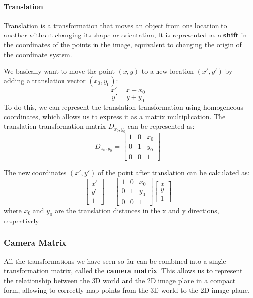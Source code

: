 \paragraph{Translation}
Translation is a transformation that moves an object from one location to another without changing its shape or orientation, 
It is represented as a \textbf{shift} in the coordinates of the points in the image, equivalent to changing the origin of the coordinate system.

We basically want to move the point \( (x, y) \) to a new location \( (x', y') \) by adding a translation vector \( (x_0, y_0) \):
\[ x' = x + x_0 \]
\[ y' = y + y_0 \]
To do this, we can represent the translation transformation using homogeneous coordinates, which allows us to express it as a matrix multiplication.
The translation transformation matrix $D_{x_0, y_0}$ can be represented as:
\[ D_{x_0, y_0} = \begin{bmatrix} 1 & 0 & x_0 \\ 0 & 1 & y_0 \\ 0 & 0 & 1 \end{bmatrix} \]

The new coordinates \( (x', y') \) of the point after translation can be calculated as:
\[\begin{bmatrix} x' \\ y' \\ 1 \end{bmatrix} = \begin{bmatrix} 1 & 0 & x_0 \\ 0 & 1 & y_0 \\ 0 & 0 & 1 \end{bmatrix} \begin{bmatrix} x \\ y \\ 1 \end{bmatrix} \]
where \( x_0 \) and \( y_0 \) are the translation distances in the x and y directions, respectively.

\subsubsection{Camera Matrix}
All the transformations we have seen so far can be combined into a single transformation matrix, called the \textbf{camera matrix}. 
This allows us to represent the relationship between the 3D world and the 2D image plane in a compact form, allowing 
to correctly map points from the 3D world to the 2D image plane.

